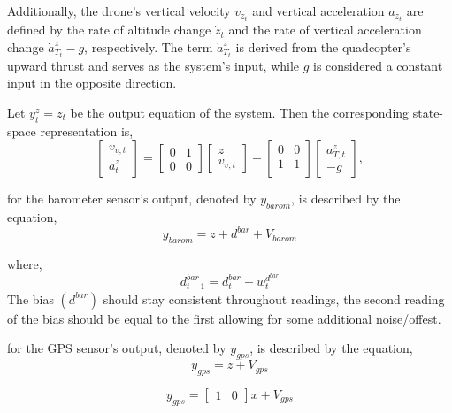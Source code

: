 \documentclass{article}
\begin{document}
Additionally, the drone's vertical velocity \( v_{z_t} \) and vertical acceleration \( a_{z_t} \) are defined by the rate of altitude change \( \dot{z}_t \) and the rate of vertical acceleration change \( \dot{a}^z_{T_t} - g \), respectively. The term \( \dot{a}^z_{T_t} \) is derived from the quadcopter's upward thrust and serves as the system's input, while \( g \) is considered a constant input in the opposite direction.

Let \( y_{t}^z = z_t \) be the output equation of the system. Then the corresponding state-space representation is,
\begin{equation}
\begin{bmatrix}
v_{v,t}\\
a_{t}^z
\end{bmatrix} =
\begin{bmatrix}
0 & 1 \\
0 & 0 
\end{bmatrix}
\begin{bmatrix}
z\\
v_{v,t}
\end{bmatrix} + 
\begin{bmatrix}
0 & 0 \\
1 & 1 \\ 
\end{bmatrix}
\begin{bmatrix}
a_{T,t}^z \\ 
-g
\end{bmatrix},\label{eq:4}
\end{equation}

\noindent
for the barometer sensor's output, denoted by \( y_{barom} \), is described by the equation,
\begin{equation}
y_{barom} = z + d^{bar} + V_{barom}
\end{equation}

where, 
\begin{equation}
    d^{bar}_{t+1} = d^{bar}_t + w_{t}^{d^{bar}}
\end{equation}
The bias $(d^{bar})$ should stay consistent throughout readings, 
the second reading of the bias should be equal to the first allowing for some additional noise/offest.

\noindent
for the GPS sensor's output, denoted by \( y_{gps} \), is described by the equation,
\begin{equation}
y_{gps} = z + V_{gps}
\end{equation}

\begin{equation}
y_{gps} =
\begin{bmatrix}
    1 & 0
\end{bmatrix}
x + V_{gps}
\end{equation}
\end{document}
